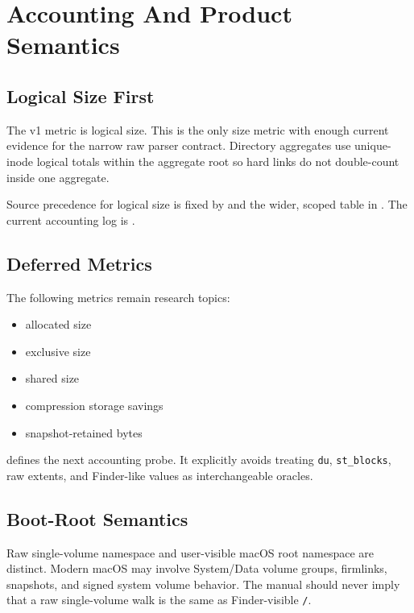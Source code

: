 \chapter{Accounting And Product Semantics}

\section{Logical Size First}

The v1 metric is logical size. This is the only size metric with enough current
evidence for the narrow raw parser contract. Directory aggregates use
unique-inode logical totals within the aggregate root so hard links do not
double-count inside one aggregate.

Source precedence for logical size is fixed by
 and
the wider, scoped table in
. The
current accounting log is
.

\section{Deferred Metrics}

The following metrics remain research topics:

\begin{itemize}
  \item allocated size
  \item exclusive size
  \item shared size
  \item compression storage savings
  \item snapshot-retained bytes
\end{itemize}

 defines the
next accounting probe. It explicitly avoids treating \texttt{du},
\texttt{st\_blocks}, raw extents, and Finder-like values as interchangeable
oracles.

\section{Boot-Root Semantics}

Raw single-volume namespace and user-visible macOS root namespace are distinct.
Modern macOS may involve System/Data volume groups, firmlinks, snapshots, and
signed system volume behavior. The manual should never imply that a raw
single-volume walk is the same as Finder-visible \texttt{/}.

